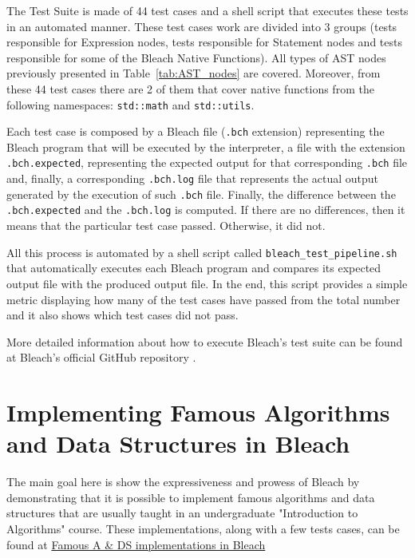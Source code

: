 The Test Suite is made of 44 test cases and a shell script that executes these tests in an automated manner. These test cases work are divided into 3 groups (tests responsible for Expression nodes, tests responsible for Statement nodes and tests responsible for some of the Bleach Native Functions). All types of AST nodes previously presented in Table~\ref{tab:AST_nodes} are covered. Moreover, from these 44 test cases there are 2 of them that cover native functions from the following namespaces: \texttt{std::math} and \texttt{std::utils}.

Each test case is composed by a Bleach file (\texttt{.bch} extension) representing the Bleach program that will be executed by the interpreter, a file with the extension 
 \texttt{.bch.expected}, representing the expected output for that corresponding \texttt{.bch} file and, finally, a corresponding \texttt{.bch.log} file that represents the actual output generated by the execution of such \texttt{.bch} file. Finally, the difference between the \texttt{.bch.expected} and the \texttt{.bch.log} is computed. If there are no differences, then it means that the particular test case passed. Otherwise, it did not.

 All this process is automated by a shell script called \texttt{bleach\_test\_pipeline.sh} that automatically executes each Bleach program and compares its expected output file with the produced output file. In the end, this script provides a simple metric displaying how many of the test cases have passed from the total number and it also shows which test cases did not pass.

 More detailed information about how to execute Bleach's test suite can be found at Bleach's official GitHub repository \cite{bleach_lang_git_repo}.


\section{Implementing Famous Algorithms and Data Structures in Bleach}
The main goal here is show the expressiveness and prowess of Bleach by demonstrating that it is possible to implement famous algorithms and data structures that are usually taught in an undergraduate "Introduction to Algorithms" course. These implementations, along with a few tests cases, can be found at \href{https://github.com/vmmc2/Bleach/tree/main/tests/algorithms_and_data_structures}{Famous A \& DS implementations in Bleach}

